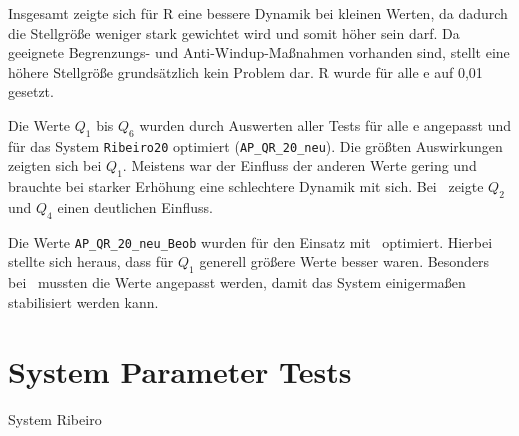 Insgesamt zeigte sich für R eine bessere Dynamik bei kleinen Werten, da dadurch die Stellgröße weniger stark gewichtet wird und somit höher sein darf.
Da geeignete Begrenzungs- und Anti-Windup-Maßnahmen vorhanden sind, stellt eine höhere Stellgröße grundsätzlich kein Problem dar.
R wurde für alle \ap e auf 0,01 gesetzt.

Die Werte $Q_1$ bis $Q_6$ wurden durch Auswerten aller Tests für alle \ap e angepasst und für das System \texttt{Ribeiro20} optimiert (\texttt{AP\_QR\_20\_neu}).
Die größten Auswirkungen zeigten sich bei $Q_1$. 
Meistens war der Einfluss der anderen Werte gering und brauchte bei starker Erhöhung eine schlechtere Dynamik mit sich.
Bei \apv\ zeigte $Q_2$ und $Q_4$ einen deutlichen Einfluss.

Die Werte \texttt{AP\_QR\_20\_neu\_Beob} wurden für den Einsatz mit \beob\ optimiert.
Hierbei stellte sich heraus, dass für $Q_1$ generell größere Werte besser waren.
Besonders bei \apv\ mussten die Werte angepasst werden, damit das System einigermaßen stabilisiert werden kann.


\section{System Parameter Tests}\label{sec:x0sys}

System Ribeiro

